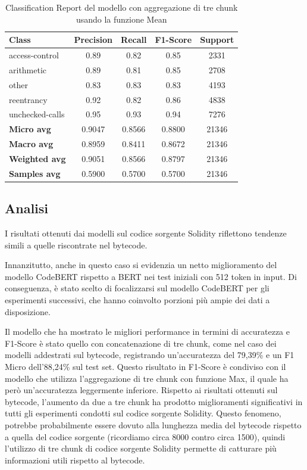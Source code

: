 \documentclass[../../Thesis.tex]{subfiles}
\begin{document}
\begin{table}[H]
    \centering
    \small
    \begin{tabular}{lcccc}
    \hline
    \textbf{Class} & \textbf{Precision} & \textbf{Recall} & \textbf{F1-Score} & \textbf{Support} \\
    \hline
    access-control & 0.89 & 0.82 & 0.85 & 2331 \\
    arithmetic & 0.89 & 0.81 & 0.85 & 2708 \\
    other & 0.83 & 0.83 & 0.83 & 4193 \\
    reentrancy & 0.92 & 0.82 & 0.86 & 4838 \\
    unchecked-calls & 0.95 & 0.93 & 0.94 & 7276 \\
    \hline
    \textbf{Micro avg} & 0.9047 & 0.8566 & 0.8800 & 21346 \\
    \textbf{Macro avg} & 0.8959 & 0.8411 & 0.8672 & 21346 \\
    \textbf{Weighted avg} & 0.9051 & 0.8566 & 0.8797 & 21346 \\
    \textbf{Samples avg} & 0.5900 & 0.5700 & 0.5700 & 21346 \\
    \hline
    \end{tabular}
    \caption{Classification Report del modello con aggregazione di tre chunk usando la funzione Mean}
    \end{table}
\subsection{Analisi}
I risultati ottenuti dai modelli  sul codice sorgente Solidity riflettono tendenze simili a quelle riscontrate nel bytecode.

Innanzitutto, anche in questo caso si evidenzia un netto miglioramento del modello CodeBERT rispetto a BERT nei test iniziali con 512 token in input. Di conseguenza, è stato scelto di focalizzarsi sul modello CodeBERT per gli esperimenti successivi, che hanno coinvolto porzioni più ampie dei dati a disposizione.

Il modello che ha mostrato le migliori performance in termini di accuratezza e F1-Score è stato quello con concatenazione di tre chunk, come nel caso dei modelli addestrati sul bytecode, registrando un'accuratezza del 79,39\% e un F1 Micro dell'88,24\% sul test set. Questo risultato in F1-Score è condiviso con il modello che utilizza l'aggregazione di tre chunk con funzione Max, il quale ha però un'accuratezza leggermente inferiore. Rispetto ai risultati ottenuti sul bytecode, l'aumento da due a tre chunk ha prodotto miglioramenti significativi in tutti gli esperimenti condotti sul codice sorgente Solidity. Questo fenomeno, potrebbe probabilmente essere dovuto alla lunghezza media del bytecode rispetto a quella del codice sorgente (ricordiamo circa 8000 contro circa 1500), quindi l'utilizzo di tre chunk di codice sorgente Solidity permette di catturare più informazioni utili rispetto al bytecode.
\end{document}
